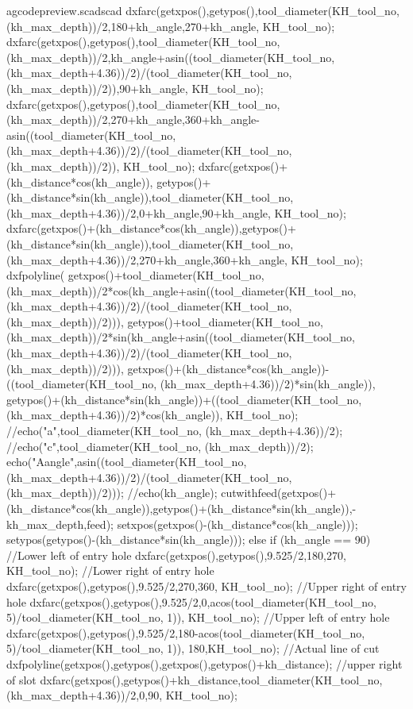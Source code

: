 \documentclass{ltxdoc}
\begin{document}
\begin{writecode}{a}{gcodepreview.scad}{scad}
{  dxfarc(getxpos(),getypos(),tool_diameter(KH_tool_no, (kh_max_depth))/2,180+kh_angle,270+kh_angle, KH_tool_no);
dxfarc(getxpos(),getypos(),tool_diameter(KH_tool_no, (kh_max_depth))/2,kh_angle+asin((tool_diameter(KH_tool_no, (kh_max_depth+4.36))/2)/(tool_diameter(KH_tool_no, (kh_max_depth))/2)),90+kh_angle, KH_tool_no);
dxfarc(getxpos(),getypos(),tool_diameter(KH_tool_no, (kh_max_depth))/2,270+kh_angle,360+kh_angle-asin((tool_diameter(KH_tool_no, (kh_max_depth+4.36))/2)/(tool_diameter(KH_tool_no, (kh_max_depth))/2)), KH_tool_no);
dxfarc(getxpos()+(kh_distance*cos(kh_angle)),
  getypos()+(kh_distance*sin(kh_angle)),tool_diameter(KH_tool_no, (kh_max_depth+4.36))/2,0+kh_angle,90+kh_angle, KH_tool_no);
dxfarc(getxpos()+(kh_distance*cos(kh_angle)),getypos()+(kh_distance*sin(kh_angle)),tool_diameter(KH_tool_no, (kh_max_depth+4.36))/2,270+kh_angle,360+kh_angle, KH_tool_no);
dxfpolyline( getxpos()+tool_diameter(KH_tool_no, (kh_max_depth))/2*cos(kh_angle+asin((tool_diameter(KH_tool_no, (kh_max_depth+4.36))/2)/(tool_diameter(KH_tool_no, (kh_max_depth))/2))),
 getypos()+tool_diameter(KH_tool_no, (kh_max_depth))/2*sin(kh_angle+asin((tool_diameter(KH_tool_no, (kh_max_depth+4.36))/2)/(tool_diameter(KH_tool_no, (kh_max_depth))/2))),
 getxpos()+(kh_distance*cos(kh_angle))-((tool_diameter(KH_tool_no, (kh_max_depth+4.36))/2)*sin(kh_angle)),
 getypos()+(kh_distance*sin(kh_angle))+((tool_diameter(KH_tool_no, (kh_max_depth+4.36))/2)*cos(kh_angle)), KH_tool_no);
//echo("a",tool_diameter(KH_tool_no, (kh_max_depth+4.36))/2);
//echo("c",tool_diameter(KH_tool_no, (kh_max_depth))/2);
echo("Aangle",asin((tool_diameter(KH_tool_no, (kh_max_depth+4.36))/2)/(tool_diameter(KH_tool_no, (kh_max_depth))/2)));
//echo(kh_angle);
 cutwithfeed(getxpos()+(kh_distance*cos(kh_angle)),getypos()+(kh_distance*sin(kh_angle)),-kh_max_depth,feed);
 setxpos(getxpos()-(kh_distance*cos(kh_angle)));
 setypos(getypos()-(kh_distance*sin(kh_angle)));
  } else if (kh_angle == 90) {
    //Lower left of entry hole
    dxfarc(getxpos(),getypos(),9.525/2,180,270, KH_tool_no);
    //Lower right of entry hole
    dxfarc(getxpos(),getypos(),9.525/2,270,360, KH_tool_no);
    //Upper right of entry hole
    dxfarc(getxpos(),getypos(),9.525/2,0,acos(tool_diameter(KH_tool_no, 5)/tool_diameter(KH_tool_no, 1)), KH_tool_no);
    //Upper left of entry hole
    dxfarc(getxpos(),getypos(),9.525/2,180-acos(tool_diameter(KH_tool_no, 5)/tool_diameter(KH_tool_no, 1)), 180,KH_tool_no);
    //Actual line of cut
    dxfpolyline(getxpos(),getypos(),getxpos(),getypos()+kh_distance);
    //upper right of slot
    dxfarc(getxpos(),getypos()+kh_distance,tool_diameter(KH_tool_no, (kh_max_depth+4.36))/2,0,90, KH_tool_no);
}
\end{writecode}
\end{document}
